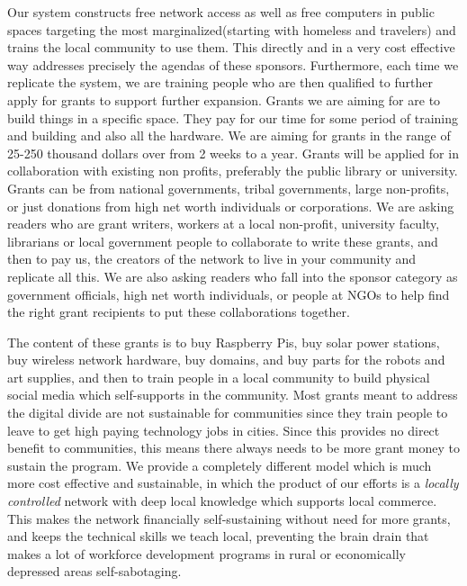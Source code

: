 Our system constructs free network access as well as free computers in
public spaces targeting the most marginalized(starting with homeless and
travelers) and trains the local community to use them. This directly and
in a very cost effective way addresses precisely the agendas of these
sponsors. Furthermore, each time we replicate the system, we are
training people who are then qualified to further apply for grants to
support further expansion. Grants we are aiming for are to build things
in a specific space. They pay for our time for some period of training
and building and also all the hardware. We are aiming for grants in the
range of 25-250 thousand dollars over from 2 weeks to a year. Grants
will be applied for in collaboration with existing non profits,
preferably the public library or university. Grants can be from national
governments, tribal governments, large non-profits, or just donations
from high net worth individuals or corporations. We are asking readers
who are grant writers, workers at a local non-profit, university
faculty, librarians or local government people to collaborate to write
these grants, and then to pay us, the creators of the network to live in
your community and replicate all this. We are also asking readers who
fall into the sponsor category as government officials, high net worth
individuals, or people at NGOs to help find the right grant recipients
to put these collaborations together.

The content of these grants is to buy Raspberry Pis, buy solar power
stations, buy wireless network hardware, buy domains, and buy parts for
the robots and art supplies, and then to train people in a local
community to build physical social media which self-supports in the
community. Most grants meant to address the digital divide are not
sustainable for communities since they train people to leave to get high
paying technology jobs in cities. Since this provides no direct benefit
to communities, this means there always needs to be more grant money to
sustain the program. We provide a completely different model which is
much more cost effective and sustainable, in which the product of our
efforts is a \emph{locally controlled} network with deep local knowledge
which supports local commerce. This makes the network financially
self-sustaining without need for more grants, and keeps the technical
skills we teach local, preventing the brain drain that makes a lot of
workforce development programs in rural or economically depressed areas
self-sabotaging.

